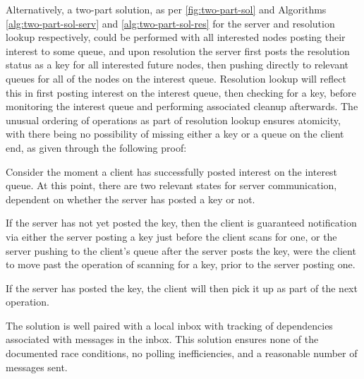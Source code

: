 Alternatively, a two-part solution, as per \cref{fig:two-part-sol} and
 Algorithms \ref{alg:two-part-sol-serv} and \ref{alg:two-part-sol-res} for the
server and resolution lookup respectively, could be performed with all
interested nodes posting their interest to some queue, and upon resolution the
server first posts the resolution status as a key for all interested future
nodes, then pushing directly to relevant queues for all of the nodes on the
interest queue.
Resolution lookup will reflect this in first posting interest on the interest
queue, then checking for a key, before monitoring the interest queue and
performing associated cleanup afterwards.
The unusual ordering of operations as part of resolution lookup ensures
atomicity, with there being no possibility of missing either a key or a queue
on the client end, as given through the following proof:

Consider the moment a client has successfully posted interest on the interest queue.
At this point, there are two relevant states for server communication,
dependent on whether the server has posted a key or not.

If the server has not yet posted the key, then the client is guaranteed
notification via either the server posting a key just before the client scans
for one, or the server pushing to the client's queue after the server posts the
key, were the client to move past the operation of scanning for a key, prior to
the server posting one.

If the server has posted the key, the client will then pick it up as part of
the next operation.

The solution is well paired with a local inbox with tracking of dependencies
associated with messages in the inbox.
This solution ensures none of the documented race conditions, no polling
inefficiencies, and a reasonable number of messages sent.
